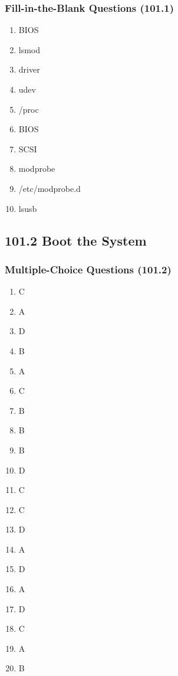 \documentclass[a4paper]{report}
\begin{document}
\subsubsection*{Fill-in-the-Blank Questions (101.1)}
\begin{enumerate}[1.]
    \item BIOS
    \item lsmod
    \item driver
    \item udev
    \item /proc
    \item BIOS
    \item SCSI
    \item modprobe
    \item /etc/modprobe.d
    \item lsusb
    \end{enumerate}





    \subsection*{101.2 Boot the System}
    \subsubsection*{Multiple-Choice Questions (101.2)}
\begin{enumerate}[1.]
    \item C
    \item A
    \item D
    \item B
    \item A
    \item C
    \item B
    \item B
    \item B
    \item D
    \item C
    \item C
    \item D
    \item A
    \item D
    \item A
    \item D
    \item C
    \item A
    \item B
    \end{enumerate}
\end{document}
